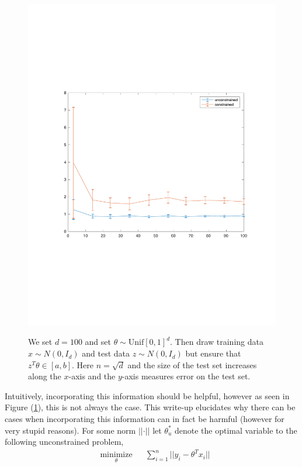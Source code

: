\documentclass[12pt]{article}
\begin{document}
\begin{figure}
\begin{minipage}{\linewidth}
    \includegraphics[width=\linewidth]{figure05bound.pdf}
    \label{fig:5b}
\end{minipage}
\caption{We set $d = 100$ and set $\theta \sim \textrm{Unif}[0,1]^{d}$. Then draw training data $x \sim N(0,I_{d})$ and test data $z \sim N(0,I_{d})$ but ensure that $z^{T}\theta \in [a,b]$. Here $n = \sqrt{d}$ and the size of the test set increases along the $x$-axis and the $y$-axis measures error on the test set.}\label{mainfig}
\end{figure}

Intuitively, incorporating this information should be helpful, however as seen in Figure (\ref{mainfig}), this is not always the case. This write-up elucidates why there can be cases when incorporating this information can in fact be harmful (however for very stupid reasons). For some norm $\lvert \lvert \cdot \lvert \lvert $ let $\theta^{*}_{u}$ denote the optimal variable to the following unconstrained problem,
\begin{equation}
\label{original} 
\begin{aligned}
& \underset{\theta}{\text{minimize}}
& & \sum \limits_{i=1}^{n} \lvert \lvert y_{i} - \theta^{T}x_{i} \lvert \lvert \\
\end{aligned}
\end{equation}
\end{document}
